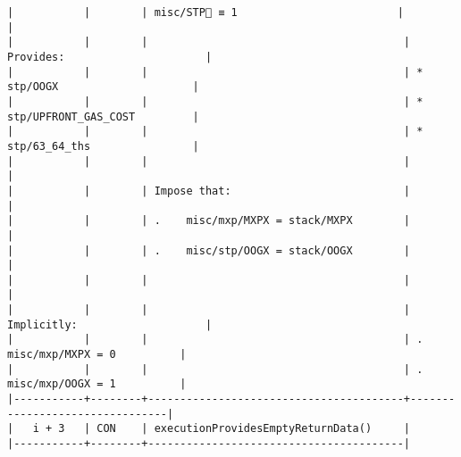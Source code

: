 \documentclass[varwidth=\maxdimen,margin=0.5cm,multi={verbatim}]{standalone}
\begin{document}
\begin{verbatim}
|           |        | misc/STP🚩 ≡ 1                         |                                |
|           |        |                                        | Provides:                      |
|           |        |                                        | * stp/OOGX                     |
|           |        |                                        | * stp/UPFRONT_GAS_COST         |
|           |        |                                        | * stp/63_64_ths                |
|           |        |                                        |                                |
|           |        | Impose that:                           |                                |
|           |        | .    misc/mxp/MXPX = stack/MXPX        |                                |
|           |        | .    misc/stp/OOGX = stack/OOGX        |                                |
|           |        |                                        |                                |
|           |        |                                        | Implicitly:                    |
|           |        |                                        | .   misc/mxp/MXPX = 0          |
|           |        |                                        | .   misc/mxp/OOGX = 1          |
|-----------+--------+----------------------------------------+--------------------------------|
|   i + 3   | CON    | executionProvidesEmptyReturnData()     |
|-----------+--------+----------------------------------------|

\end{verbatim}
\end{document}
